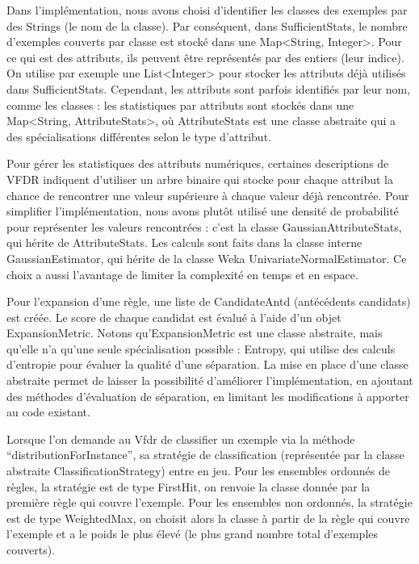         Dans l’implémentation, nous avons choisi d’identifier les classes des exemples par des Strings (le nom de la classe). Par conséquent, dans SufficientStats, le nombre d’exemples couverts par classe est stocké dans une Map<String, Integer>. Pour ce qui est des attributs, ils peuvent être représentés par des entiers (leur indice). On utilise par exemple une List<Integer> pour stocker les attributs déjà utilisés dans SufficientStats. Cependant, les attributs sont parfois identifiés par leur nom, comme les classes : les statistiques par attributs sont stockés dans une Map<String, AttributeStats>, où AttributeStats est une classe abstraite qui a des spécialisations différentes selon le type d’attribut.

        Pour gérer les statistiques des attributs numériques, certaines descriptions de VFDR indiquent d’utiliser un arbre binaire qui stocke pour chaque attribut la chance de rencontrer une valeur supérieure à chaque valeur déjà rencontrée. Pour simplifier l’implémentation, nous avons plutôt utilisé une densité de probabilité pour représenter les valeurs rencontrées : c’est la classe GaussianAttributeStats, qui hérite de AttributeStats. Les calculs sont faits dans la classe interne GaussianEstimator, qui hérite de la classe Weka UnivariateNormalEstimator. Ce choix a aussi l’avantage de limiter la complexité en temps et en espace.
        
        Pour l’expansion d’une règle, une liste de CandidateAntd (antécédents candidats) est créée. Le score de chaque candidat est évalué à l’aide d’un objet ExpansionMetric. Notons qu’ExpansionMetric est une classe abstraite, mais qu’elle n’a qu’une seule spécialisation possible : Entropy, qui utilise des calculs d’entropie pour évaluer la qualité d’une séparation. La mise en place d’une classe abstraite permet de laisser la possibilité d’améliorer l’implémentation, en ajoutant des méthodes d’évaluation de séparation, en limitant les modifications à apporter au code existant.
        
        Lorsque l’on demande au Vfdr de classifier un exemple via la méthode “distributionForInstance”, sa stratégie de classification (représentée par la classe abstraite ClassificationStrategy) entre en jeu. Pour les ensembles ordonnés de règles, la stratégie est de type FirstHit, on renvoie la classe donnée par la première règle qui couvre l’exemple. Pour les ensembles non ordonnés, la stratégie est de type WeightedMax, on choisit alors la classe à partir de la règle qui couvre l’exemple et a le poids le plus élevé (le plus grand nombre total d’exemples couverts).
